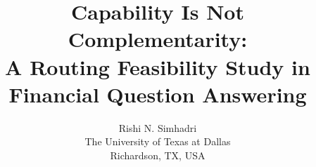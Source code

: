 \documentclass[11pt]{article}
\title{Capability Is Not Complementarity:\\
A Routing Feasibility Study in Financial Question Answering}
\author{Rishi N. Simhadri \\
  The University of Texas at Dallas \\
  Richardson, TX, USA}
\begin{document}
\maketitle

\begin{abstract}

\end{abstract}











\end{document}
